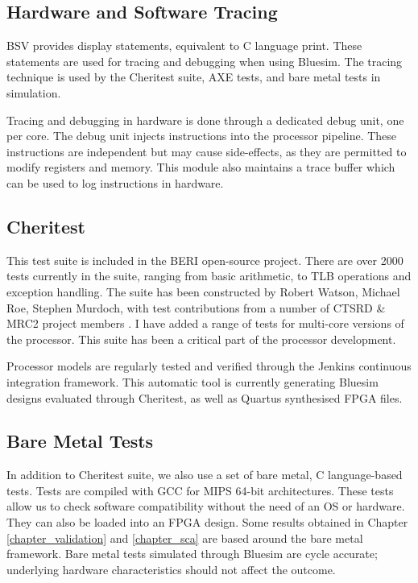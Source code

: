 	\subsection{Hardware and Software Tracing}
		BSV provides display statements, equivalent to C language print. These statements are used for tracing and debugging when using Bluesim. The tracing technique is used by the Cheritest suite, AXE tests, and bare metal tests in simulation.
		
		Tracing and debugging in hardware is done through a dedicated debug unit, one per core. The debug unit injects instructions into the processor pipeline. These instructions are independent but may cause side-effects, as they are permitted to modify registers and memory. This module also maintains a trace buffer which can be used to log instructions in hardware.
	
	\subsection{Cheritest}
		This test suite is included in the BERI open-source project. There are over 2000 tests currently in the suite, ranging from basic arithmetic, to TLB operations and exception handling. The suite has been constructed by Robert Watson, Michael Roe, Stephen Murdoch, with test contributions from a number of CTSRD \& MRC2 project members \cite{CTSRD,MRC2}. I have added a range of tests for multi-core versions of the processor. This suite has been a critical part of the processor development.
		
		Processor models are regularly tested and verified through the Jenkins continuous integration framework. This automatic tool is currently generating Bluesim designs evaluated through Cheritest, as well as Quartus synthesised FPGA files.
		
	\subsection{Bare Metal Tests}
		In addition to Cheritest suite, we also use a set of bare metal, C language-based tests. Tests are compiled with GCC for MIPS 64-bit architectures. These tests allow us to check software compatibility without the need of an OS or hardware. They can also be loaded into an FPGA design. Some results obtained in Chapter \ref{chapter_validation} and \ref{chapter_sca} are based around the bare metal framework. 
		Bare metal tests simulated through Bluesim are cycle accurate; underlying hardware characteristics should not affect the outcome. 

